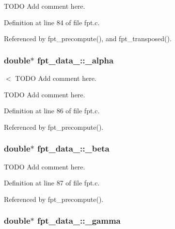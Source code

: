 T\-O\-D\-O Add comment here. 



Definition at line 84 of file fpt.\-c.



Referenced by fpt\-\_\-precompute(), and fpt\-\_\-transposed().

\hypertarget{structfpt__data___a048079e693b84da0013ed8edba95a2e7}{
\subsubsection[{\-\_\-alpha}]{\setlength{\rightskip}{0pt plus 5cm}double$\ast$ fpt\-\_\-data\-\_\-\-::\-\_\-alpha}}\label{structfpt__data___a048079e693b84da0013ed8edba95a2e7}


$<$ T\-O\-D\-O Add comment here. 

T\-O\-D\-O Add comment here. 

Definition at line 86 of file fpt.\-c.



Referenced by fpt\-\_\-precompute().

\hypertarget{structfpt__data___aeb8f8f8eb1c0b93d135e8e083835edfb}{
\subsubsection[{\-\_\-beta}]{\setlength{\rightskip}{0pt plus 5cm}double$\ast$ fpt\-\_\-data\-\_\-\-::\-\_\-beta}}\label{structfpt__data___aeb8f8f8eb1c0b93d135e8e083835edfb}


T\-O\-D\-O Add comment here. 



Definition at line 87 of file fpt.\-c.



Referenced by fpt\-\_\-precompute().

\hypertarget{structfpt__data___a1fb58e76d4d78d6ed0f71a040d7157dc}{
\subsubsection[{\-\_\-gamma}]{\setlength{\rightskip}{0pt plus 5cm}double$\ast$ fpt\-\_\-data\-\_\-\-::\-\_\-gamma}}\label{structfpt__data___a1fb58e76d4d78d6ed0f71a040d7157dc}


